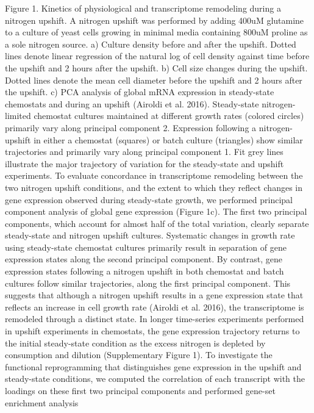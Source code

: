 Figure 1. Kinetics of physiological and transcriptome remodeling
during a nitrogen upshift.  A nitrogen upshift was performed by adding
400uM glutamine to a culture of yeast cells growing in minimal media
containing 800uM proline as a sole nitrogen source. a) Culture density
before and after the upshift. Dotted lines denote linear regression of
the natural log of cell density against time before the upshift and 2
hours after the upshift. b) Cell size changes during the upshift.
Dotted lines denote the mean cell diameter before the upshift and  2
hours after the upshift. c) PCA analysis of global mRNA expression in
steady-state chemostats and during an upshift (Airoldi et al. 2016).
Steady-state nitrogen-limited chemostat cultures maintained at
different growth rates (colored circles) primarily vary along
principal component 2.  Expression following a nitrogen-upshift in
either a chemostat (squares) or batch culture (triangles) show similar
trajectories and primarily vary along principal component 1.  Fit grey
lines  illustrate the major trajectory of variation for the
steady-state and upshift experiments.  To evaluate concordance in
transcriptome remodeling between the two nitrogen upshift conditions,
and the extent to which they reflect changes in gene expression
observed during steady-state growth, we performed  principal component
analysis of global gene expression (Figure 1c). The first two
principal components, which account for almost half of the total
variation, clearly separate steady-state and nitrogen upshift
cultures.  Systematic changes in growth rate using steady-state
chemostat cultures primarily result in separation of gene expression
states along the second principal component.  By contrast, gene
expression states following a nitrogen upshift in both chemostat and
batch cultures follow similar trajectories, along the first principal
component.  This suggests that although a nitrogen upshift results in
a gene expression state that reflects an increase in cell growth rate
(Airoldi et al. 2016), the transcriptome is remodeled through a
distinct state.  In longer time-series experiments performed in
upshift experiments in chemostats, the gene expression trajectory
returns to the initial steady-state condition as the excess nitrogen
is depleted by consumption and dilution (Supplementary Figure 1).  To
investigate the functional reprogramming that distinguishes gene
expression in the upshift and steady-state conditions, we computed the
correlation of each transcript with the loadings on these first two
principal components and performed gene-set enrichment analysis
